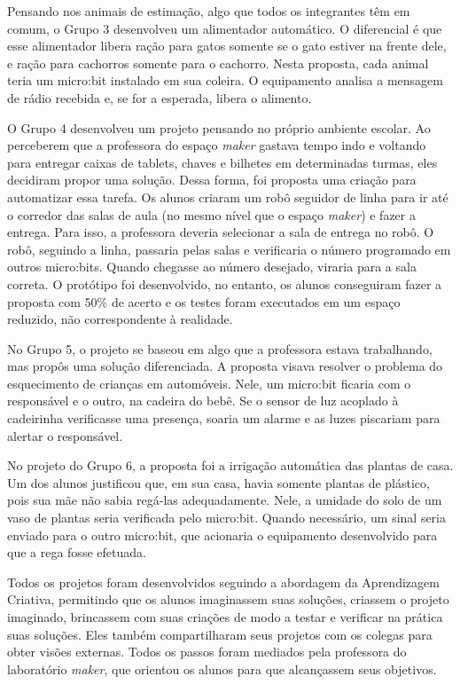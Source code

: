 \documentclass[portuguese]{textolivre}
\begin{document}
Pensando nos animais de estimação, algo que todos os integrantes têm em comum, o Grupo 3 desenvolveu um alimentador automático. O diferencial é que esse alimentador libera ração para gatos somente se o gato estiver na frente dele, e ração para cachorros somente para o cachorro. Nesta proposta, cada animal teria um micro:bit instalado em sua coleira. O equipamento analisa a mensagem de rádio recebida e, se for a esperada, libera o alimento.

O Grupo 4 desenvolveu um projeto pensando no próprio ambiente escolar. Ao perceberem que a professora do espaço \textit{maker} gastava tempo indo e voltando para entregar caixas de tablets, chaves e bilhetes em determinadas turmas, eles decidiram propor uma solução. Dessa forma, foi proposta uma criação para automatizar essa tarefa. Os alunos criaram um robô seguidor de linha para ir até o corredor das salas de aula (no mesmo nível que o espaço \textit{maker}) e fazer a entrega. Para isso, a professora deveria selecionar a sala de entrega no robô. O robô, seguindo a linha, passaria pelas salas e verificaria o número programado em outros micro:bits. Quando chegasse ao número desejado, viraria para a sala correta. O protótipo foi desenvolvido, no entanto, os alunos conseguiram fazer a proposta com 50\% de acerto e os testes foram executados em um espaço reduzido, não correspondente à realidade.

No Grupo 5, o projeto se baseou em algo que a professora estava trabalhando, mas propôs uma solução diferenciada. A proposta visava resolver o problema do esquecimento de crianças em automóveis. Nele, um micro:bit ficaria com o responsável e o outro, na cadeira do bebê. Se o sensor de luz acoplado à cadeirinha verificasse uma presença, soaria um alarme e as luzes piscariam para alertar o responsável.

No projeto do Grupo 6, a proposta foi a irrigação automática das plantas de casa. Um dos alunos justificou que, em sua casa, havia somente plantas de plástico, pois sua mãe não sabia regá-las adequadamente. Nele, a umidade do solo de um vaso de plantas seria verificada pelo micro:bit. Quando necessário, um sinal seria enviado para o outro micro:bit, que acionaria o equipamento desenvolvido para que a rega fosse efetuada.

Todos os projetos foram desenvolvidos seguindo a abordagem da Aprendizagem Criativa, permitindo que os alunos imaginassem suas soluções, criassem o projeto imaginado, brincassem com suas criações de modo a testar e verificar na prática suas soluções. Eles também compartilharam seus projetos com os colegas para obter visões externas. Todos os passos foram mediados pela professora do laboratório \textit{maker}, que orientou os alunos para que alcançassem seus objetivos.
\end{document}
